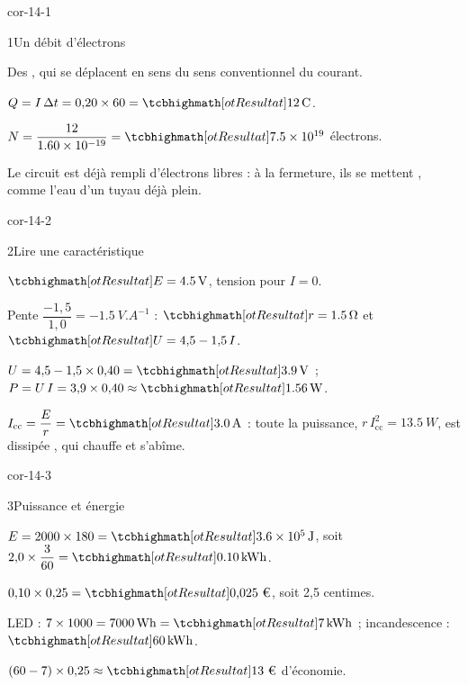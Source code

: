 \corrigesSouples

\begin{blocLivre}{cor-14-1}
\begin{corrige}{1}{Un débit d'électrons}
\begin{questions}
\item Des , qui se déplacent en sens  du sens conventionnel du courant.
\item $Q=I\,\Delta t=0{,}20\times60=\res{\qty{12}{C}}$.
\item $N=\dfrac{12}{\num{1,60e-19}}=\res{\num{7,5e19}}$ électrons.
\item Le circuit est déjà rempli d'électrons libres : à la fermeture, ils se mettent , comme l'eau
d'un tuyau déjà plein.
\end{questions}
\end{corrige}
\end{blocLivre}
\begin{blocLivre}{cor-14-2}
\begin{corrige}{2}{Lire une caractéristique}
\begin{questions}
\item $\res{E=\qty{4,5}{V}}$, tension pour $I=0$.
\item Pente $\dfrac{-1{,}5}{1{,}0}=\qty{-1,5}{V.A^{-1}}$ : $\res{r=\qty{1,5}{\ohm}}$ et $\res{U=4{,}5-1{,}5\,I}$.
\item $U=4{,}5-1{,}5\times0{,}40=\res{\qty{3,9}{V}}$ ; $P=U\,I=3{,}9\times0{,}40\approx\res{\qty{1,56}{W}}$.
\item $I_\mathrm{cc}=\dfrac{E}{r}=\res{\qty{3,0}{A}}$ : toute la puissance, $r\,I_\mathrm{cc}^2=\qty{13,5}{W}$, est dissipée , qui chauffe et s'abîme.
\end{questions}
\end{corrige}
\end{blocLivre}
\begin{blocLivre}{cor-14-3}
\begin{corrige}{3}{Puissance et énergie}
\begin{questions}
\item $E=2000\times180=\res{\qty{3,6e5}{J}}$, soit $2{,}0\times\dfrac{3}{60}=\res{\qty{0,10}{kWh}}$.
\item $0{,}10\times0{,}25=\res{\text{0,025~€}}$, soit 2,5 centimes.
\item LED : $7\times1000=\qty{7000}{Wh}=\res{\qty{7}{kWh}}$ ; incandescence : $\res{\qty{60}{kWh}}$.
\item $(60-7)\times0{,}25\approx\res{\text{13~€}}$ d'économie.
\end{questions}
\end{corrige}
\end{blocLivre}
